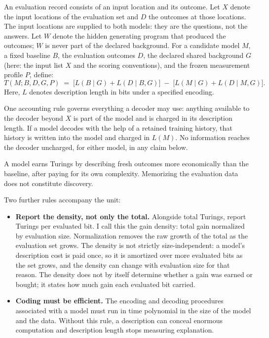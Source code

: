 \documentclass[11pt]{article}
\begin{document}
An evaluation record consists of an input location and its outcome. Let $X$ denote the input locations of the evaluation set and $D$ the outcomes at those locations. The input locations are supplied to both models: they are the questions, not the answers. Let $W$ denote the hidden generating program that produced the outcomes; $W$ is never part of the declared background. For a candidate model $M$, a fixed baseline $B$, the evaluation outcomes $D$, the declared shared background $G$ (here: the input list $X$ and the scoring conventions), and the frozen measurement profile $P$, define:
\[
T(M;B,D,G,P) \;=\; \bigl[L(B \mid G) + L(D \mid B, G)\bigr] \;-\; \bigl[L(M \mid G) + L(D \mid M, G)\bigr].
\]
Here, $L$ denotes description length in bits under a specified encoding.

One accounting rule governs everything a decoder may use: anything available to the decoder beyond $X$ is part of the model and is charged in its description length. If a model decodes with the help of a retained training history, that history is written into the model and charged in $L(M)$. No information reaches the decoder uncharged, for either model, in any claim below.

A model earns Turings by describing fresh outcomes more economically than the baseline, after paying for its own complexity. Memorizing the evaluation data does not constitute discovery.

Two further rules accompany the unit:

\begin{itemize}
\item \textbf{Report the density, not only the total.} Alongside total Turings, report Turings per evaluated bit. I call this the gain density: total gain normalized by evaluation size. Normalization removes the raw growth of the total as the evaluation set grows. The density is not strictly size-independent: a model's description cost is paid once, so it is amortized over more evaluated bits as the set grows, and the density can change with evaluation size for that reason. The density does not by itself determine whether a gain was earned or bought; it states how much gain each evaluated bit carried.
\item \textbf{Coding must be efficient.} The encoding and decoding procedures associated with a model must run in time polynomial in the size of the model and the data. Without this rule, a description can conceal enormous computation and description length stops measuring explanation.
\end{itemize}
\end{document}
